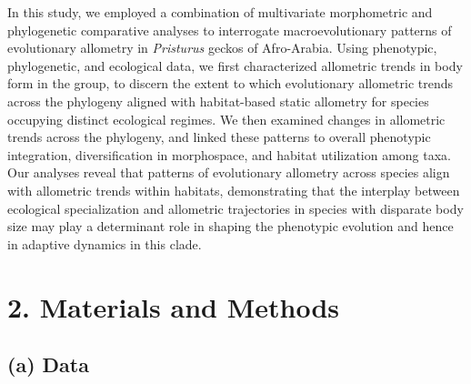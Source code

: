 \documentclass[
  11pt,
]{article}
\begin{document}
In this study, we employed a combination of multivariate morphometric
and phylogenetic comparative analyses to interrogate macroevolutionary
patterns of evolutionary allometry in \emph{Pristurus} geckos of
Afro-Arabia. Using phenotypic, phylogenetic, and ecological data, we
first characterized allometric trends in body form in the group, to
discern the extent to which evolutionary allometric trends across the
phylogeny aligned with habitat-based static allometry for species
occupying distinct ecological regimes. We then examined changes in
allometric trends across the phylogeny, and linked these patterns to
overall phenotypic integration, diversification in morphospace, and
habitat utilization among taxa. Our analyses reveal that patterns of
evolutionary allometry across species align with allometric trends
within habitats, demonstrating that the interplay between ecological
specialization and allometric trajectories in species with disparate
body size may play a determinant role in shaping the phenotypic
evolution and hence in adaptive dynamics in this clade.

\hypertarget{materials-and-methods}{%
\section{2. Materials and Methods}\label{materials-and-methods}}

\hypertarget{a-data}{%
\subsection{(a) Data}\label{a-data}}
\end{document}
